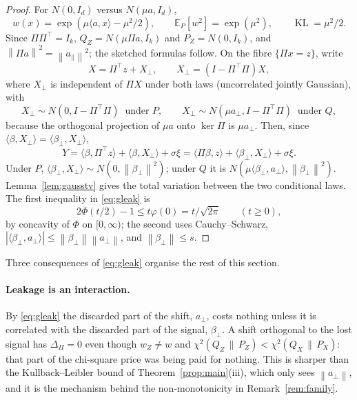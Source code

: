 \documentclass[11pt,a4paper]{article}
\newcommand{\PX}{P_X}
\newcommand{\QX}{Q_X}
\newcommand{\chisq}{\chi^2(\QX\,\|\,\PX)}
\newcommand{\chisqZ}{\chi^2(Q_Z\,\|\,P_Z)}
\newcommand{\norm}[1]{\left\|#1\right\|}
\newcommand{\E}{\mathbb{E}}
\newcommand{\KL}{\operatorname{KL}}
\theoremstyle{plain}
\theoremstyle{definition}
\theoremstyle{remark}
\begin{document}
\begin{proof}
For $N(0,I_d)$ versus $N(\mu a,I_d)$,
\[
w(x)=\exp(\mu\langle a,x\rangle-\mu^2/2),\qquad \E_P[w^2]=\exp(\mu^2),\qquad \KL=\mu^2/2.
\]
Since $\Pi\Pi^{\!\top}=I_k$, $Q_Z=N(\mu\Pi a,I_k)$ and $P_Z=N(0,I_k)$, and $\norm{\Pi a}^2=\norm{a_\parallel}^2$; the sketched formulas follow. On the fibre $\{\Pi x=z\}$, write
\[
X=\Pi^{\!\top}z+X_\perp,\qquad X_\perp=(I-\Pi^{\!\top}\Pi)X,
\]
where $X_\perp$ is independent of $\Pi X$ under both laws (uncorrelated jointly Gaussian), with
\[
X_\perp\sim N(0,I-\Pi^{\!\top}\Pi)\ \text{ under }P,\qquad X_\perp\sim N(\mu a_\perp,I-\Pi^{\!\top}\Pi)\ \text{ under }Q,
\]
because the orthogonal projection of $\mu a$ onto $\ker\Pi$ is $\mu a_\perp$. Then, since $\langle\beta,X_\perp\rangle=\langle\beta_\perp,X_\perp\rangle$,
\[
Y=\langle\beta,\Pi^{\!\top}z\rangle+\langle\beta,X_\perp\rangle+\sigma\xi=\langle\Pi\beta,z\rangle+\langle\beta_\perp,X_\perp\rangle+\sigma\xi .
\]
Under $P$, $\langle\beta_\perp,X_\perp\rangle\sim N(0,\norm{\beta_\perp}^2)$; under $Q$ it is $N(\mu\langle\beta_\perp,a_\perp\rangle,\norm{\beta_\perp}^2)$. Lemma~\ref{lem:gausstv} gives the total variation between the two conditional laws. The first inequality in \eqref{eq:gleak} is
\[
2\Phi(t/2)-1\le t\varphi(0)=t/\sqrt{2\pi}\qquad(t\ge0),
\]
by concavity of $\Phi$ on $[0,\infty)$; the second uses Cauchy--Schwarz, $|\langle\beta_\perp,a_\perp\rangle|\le\norm{\beta_\perp}\norm{a_\perp}$, and $\norm{\beta_\perp}\le s$.
\end{proof}

Three consequences of \eqref{eq:gleak} organise the rest of this section.

\paragraph{Leakage is an interaction.} By \eqref{eq:gleak} the discarded part of the shift, $a_\perp$, costs nothing unless it is correlated with the discarded part of the signal, $\beta_\perp$. A shift orthogonal to the lost signal has $\Delta_\Pi=0$ even though $w_Z\ne w$ and $\chisqZ<\chisq$: that part of the chi-square price was being paid for nothing. This is sharper than the Kullback--Leibler bound of Theorem~\ref{prop:main}(iii), which only sees $\norm{a_\perp}$, and it is the mechanism behind the non-monotonicity in Remark~\ref{rem:family}.
\end{document}
